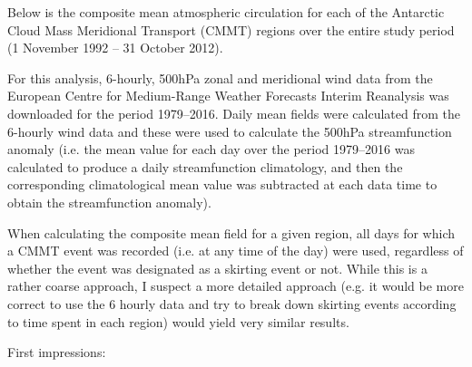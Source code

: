 Below is the composite mean atmospheric circulation for each of the Antarctic Cloud Mass Meridional Transport (CMMT) regions over the entire study period (1 November 1992 -- 31 October 2012).

For this analysis, 6-hourly, 500hPa zonal and meridional wind data from the European Centre for Medium-Range Weather Forecasts Interim Reanalysis \citep[ERA-Interim;][]{Dee2011} was downloaded for the period 1979--2016. Daily mean fields were calculated from the 6-hourly wind data and these were used to calculate the 500hPa streamfunction anomaly (i.e. the mean value for each day over the period 1979--2016 was calculated to produce a daily streamfunction climatology, and then the corresponding climatological mean value was subtracted at each data time to obtain the streamfunction anomaly).   

When calculating the composite mean field for a given region, all days for which a CMMT event was recorded (i.e. at any time of the day) were used, regardless of whether the event was designated as a skirting event or not. While this is a rather coarse approach, I suspect a more detailed approach (e.g. it would be more correct to use the 6 hourly data and try to break down skirting events according to time spent in each region) would yield very similar results.

First impressions:
